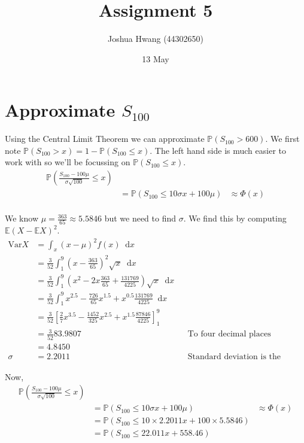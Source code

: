 \documentclass{article}
\title{Assignment 5}
\author{Joshua Hwang (44302650)}
\date{13 May}
\newcommand{\diff}{\mathop{}\!\mathrm{d}}
\newcommand{\prob}{\mathbb{P}}
\newcommand{\expect}{\mathbb{E}}
\begin{document}
\maketitle

\section{Approximate $S_{100}$}
Using the Central Limit Theorem we can approximate $\prob(S_{100} > 600)$.
We first note $\prob(S_{100} > x) = 1 - \prob(S_{100} \leq x)$. The left
hand side is much easier to work with so we'll be focussing on
$\prob(S_{100} \leq x)$.
\begin{align*}
    \prob \left( \frac{S_{100} - 100\mu}{\sigma \sqrt{100}} \leq x \right) \\
    &= \prob \left( S_{100} \leq 10 \sigma x + 100\mu \right) &\approx \Phi(x) \\
\end{align*}

We know $\mu = \frac{363}{65} \approx 5.5846$ but we need to find $\sigma$.
We find this by computing $\expect (X - \expect X)^2$.
\begin{align*}
    \text{Var} X &= \int_x (x - \mu)^2 f(x) \diff x \\
    &= \frac{3}{52} \int_1^9 (x - \frac{363}{65})^2 \sqrt{x} \diff x \\
    &= \frac{3}{52} \int_1^9
    \left( x^2 - 2x\frac{363}{65} + \frac{131769}{4225} \right)
    \sqrt{x} \diff x \\
    &= \frac{3}{52} \int_1^9
    x^{2.5} - \frac{726}{65}x^{1.5} + x^{0.5}\frac{131769}{4225} \diff x \\
    &= \frac{3}{52} \left[
    \frac{2}{7}x^{3.5} - \frac{1452}{325}x^{2.5} + x^{1.5}\frac{87846}{4225}
    \right]_1^9 \\
    &= \frac{3}{52} 83.9807 && \text{To four decimal places} \\
    &= 4.8450 \\
    \sigma &= 2.2011
    && \text{Standard deviation is the square root of Variance}
\end{align*}

Now,
\begin{align*}
    \prob \left( \frac{S_{100} - 100\mu}{\sigma \sqrt{100}} \leq x \right) \\
    &= \prob \left( S_{100} \leq 10 \sigma x + 100\mu \right) &\approx \Phi(x) \\
    &= \prob \left( S_{100} \leq 10 \times 2.2011 x + 100 \times 5.5846 \right) \\
    &= \prob \left( S_{100} \leq 22.011 x + 558.46 \right)
\end{align*}
\end{document}
